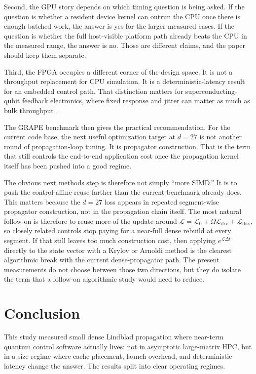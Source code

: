 \documentclass[3p,times,twocolumn]{elsarticle}
\begin{document}
Second, the GPU story depends on which timing question is being asked. If the
question is whether a resident device kernel can outrun the CPU once there is
enough batched work, the answer is yes for the larger measured cases. If the
question is whether the full host-visible platform path already beats the CPU
in the measured range, the answer is no. Those are different claims, and the
paper should keep them separate.

Third, the FPGA occupies a different corner of the design space. It is not a
throughput replacement for CPU simulation. It is a deterministic-latency
result for an embedded control path. That distinction matters for
superconducting-qubit feedback electronics, where fixed response and jitter
can matter as much as bulk throughput~\cite{Gebauer2020,Yang2021,Caune2024}.

The GRAPE benchmark then gives the practical recommendation. For the current
code base, the next useful optimization target at $d=27$ is not another
round of propagation-loop tuning. It is propagator construction. That is the
term that still controls the end-to-end application cost once the propagation
kernel itself has been pushed into a good regime.

The obvious next methods step is therefore not simply ``more SIMD.'' It is to
push the control-affine reuse farther than the current benchmark already
does. This matters because the $d=27$ loss appears in repeated segment-wise
propagator construction, not in the propagation chain itself. The most
natural follow-on is therefore to reuse more of the update around
$\mathcal{L} = \mathcal{L}_0 + \Omega \mathcal{L}_{\mathrm{drv}} +
\mathcal{L}_{\mathrm{diss}}$, so closely related controls stop paying for a
near-full dense rebuild at every segment. If that still leaves too much
construction cost, then applying $e^{\mathcal{L}\Delta t}$ directly to the
state vector with a Krylov or Arnoldi method is the clearest algorithmic
break with the current dense-propagator path. The present measurements do
not choose between those two directions, but they do isolate the term that a
follow-on algorithmic study would need to reduce.

\FloatBarrier
\section{Conclusion}

This study measured small dense Lindblad propagation where near-term quantum
control software actually lives: not in asymptotic large-matrix HPC, but in a
size regime where cache placement, launch overhead, and deterministic latency
change the answer. The results split into clear operating regimes.
\end{document}
